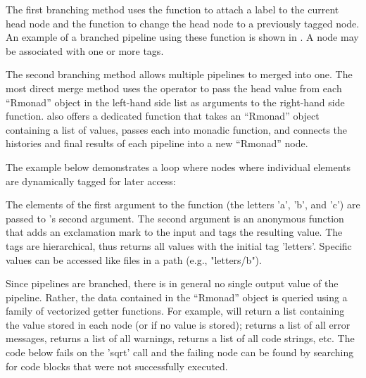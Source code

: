 The first branching method uses the  function to attach a label to
the current head node and the  function to change the head node to a
previously tagged node. An example of a branched pipeline using these function
is shown in . A node may be associated with one or
more tags.

The second branching method allows multiple pipelines to merged into one. The
most direct merge method uses the \code{\%*>\%} operator to pass the head
value from each ``Rmonad'' object in the left-hand side list as arguments to
the right-hand side function.  also offers a dedicated
 function that takes an ``Rmonad'' object containing a list of
values, passes each into monadic function, and connects the histories and final
results of each pipeline into a new ``Rmonad'' node.

The example below demonstrates a loop where nodes where individual elements are
dynamically tagged for later access:


\noindent
The elements of the first argument to the  function (the letters
'a', 'b', and 'c') are passed to 's second argument. The second
argument is an anonymous function that adds an exclamation mark to the input and tags the
resulting value. The tags are hierarchical, thus  returns all values with the initial tag 'letters'. Specific
values can be accessed like files in a path (e.g., "letters/b").

Since  pipelines are branched, there is in general no single
output value of the pipeline. Rather, the data contained in the ``Rmonad'' object
is queried using a family of vectorized getter functions. For example,
 will return a list containing the value stored in each node
(or  if no value is stored);  returns a list of all
error messages,  returns a list of all warnings,
 returns a list of all code strings, etc. The code below fails
on the 'sqrt' call and the failing node can be found by searching for code
blocks that were not successfully executed.

